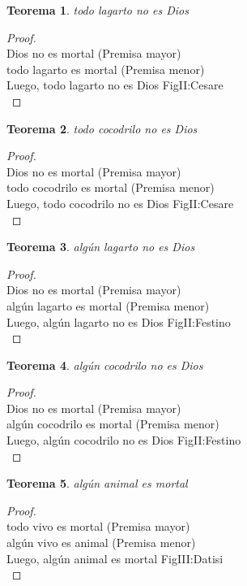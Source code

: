 ﻿\documentclass[12pt]{book}
\newtheorem{theorem}{Teorema}[chapter]
\newtheorem{proof}{Demostración}
\begin{document}
\begin{theorem}
todo lagarto no es Dios
\label{th: 106}
\end{theorem}\begin{proof}\\Dios no es mortal	 (Premisa mayor) \\todo lagarto es mortal	 (Premisa menor) \\Luego, todo lagarto no es Dios	FigII:Cesare \\ \end{proof}
\begin{theorem}
todo cocodrilo no es Dios
\label{th: 107}
\end{theorem}\begin{proof}\\Dios no es mortal	 (Premisa mayor) \\todo cocodrilo es mortal	 (Premisa menor) \\Luego, todo cocodrilo no es Dios	FigII:Cesare \\ \end{proof}
\begin{theorem}
algún lagarto no es Dios
\label{th: 108}
\end{theorem}\begin{proof}\\Dios no es mortal	 (Premisa mayor) \\algún lagarto es mortal	 (Premisa menor) \\Luego, algún lagarto no es Dios	FigII:Festino \\ \end{proof}
\begin{theorem}
algún cocodrilo no es Dios
\label{th: 109}
\end{theorem}\begin{proof}\\Dios no es mortal	 (Premisa mayor) \\algún cocodrilo es mortal	 (Premisa menor) \\Luego, algún cocodrilo no es Dios	FigII:Festino \\ \end{proof}
\begin{theorem}
algún animal es mortal
\label{th: 110}
\end{theorem}\begin{proof}\\todo vivo es mortal	 (Premisa mayor) \\algún vivo es animal	 (Premisa menor) \\Luego, algún animal es mortal	FigIII:Datisi \\ \end{proof}
\end{document}
